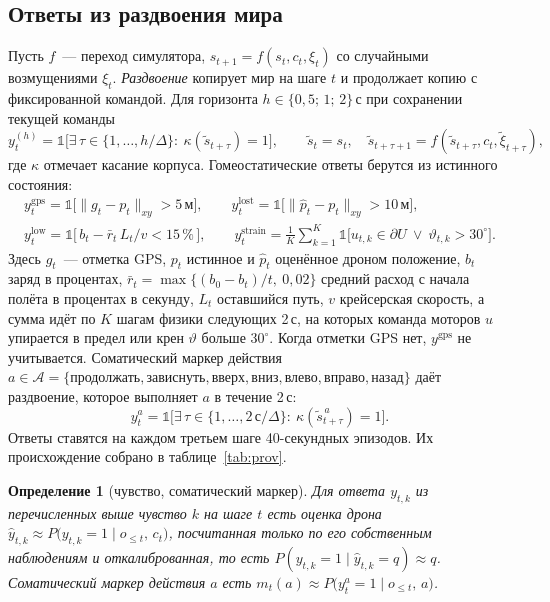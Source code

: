 \documentclass[10pt]{article}
\newtheorem{definition}{Определение}
\begin{document}
\subsection{Ответы из раздвоения мира}
Пусть $f$~--- переход симулятора, $s_{t+1}=f(s_t,c_t,\xi_t)$ со случайными возмущениями $\xi_t$. \emph{Раздвоение} копирует мир
на шаге $t$ и продолжает копию с фиксированной командой. Для горизонта $h\in\{0{,}5;\,1;\,2\}$\,с при сохранении текущей команды
\begin{equation}
y^{(h)}_t=\mathbb{1}\Big[\exists\,\tau\in\{1,\dots,h/\Delta\}:\ \kappa(\tilde s_{t+\tau})=1\Big],\qquad
\tilde s_t=s_t,\quad \tilde s_{t+\tau+1}=f(\tilde s_{t+\tau},c_t,\tilde\xi_{t+\tau}),
\end{equation}
где $\kappa$ отмечает касание корпуса. Гомеостатические ответы берутся из истинного состояния:
\begin{gather}
y^{\mathrm{gps}}_t=\mathbb{1}\big[\lVert g_t-p_t\rVert_{xy}>5\,\text{м}\big],\qquad
y^{\mathrm{lost}}_t=\mathbb{1}\big[\lVert \hat p_t-p_t\rVert_{xy}>10\,\text{м}\big],\\
y^{\mathrm{low}}_t=\mathbb{1}\big[\,b_t-\bar r_t\,L_t/v<15\,\%\,\big],\qquad
y^{\mathrm{strain}}_t=\frac{1}{K}\sum_{k=1}^{K}\mathbb{1}\big[u_{t,k}\in\partial U\ \lor\ \vartheta_{t,k}>30^\circ\big].
\end{gather}
Здесь $g_t$~--- отметка GPS, $p_t$ истинное и $\hat p_t$ оценённое дроном положение, $b_t$ заряд в процентах,
$\bar r_t=\max\{(b_0-b_t)/t,\ 0{,}02\}$ средний расход с начала полёта в процентах в секунду, $L_t$ оставшийся путь, $v$ крейсерская
скорость, а сумма идёт по $K$ шагам физики следующих 2\,с, на которых команда моторов $u$ упирается в предел или крен
$\vartheta$ больше $30^\circ$. Когда отметки GPS нет, $y^{\mathrm{gps}}$ не учитывается. Соматический маркер действия
$a\in\mathcal A=\{\text{продолжать},\text{зависнуть},\text{вверх},\text{вниз},\text{влево},\text{вправо},\text{назад}\}$ даёт
раздвоение, которое выполняет $a$ в течение 2\,с:
\begin{equation}
y^{a}_t=\mathbb{1}\Big[\exists\,\tau\in\{1,\dots,2\,\text{с}/\Delta\}:\ \kappa(\tilde s^{\,a}_{t+\tau})=1\Big].
\end{equation}
Ответы ставятся на каждом третьем шаге 40-секундных эпизодов. Их происхождение собрано в таблице~\ref{tab:prov}.

\begin{definition}[чувство, соматический маркер]\label{def:feeling}
Для ответа $y_{t,k}$ из перечисленных выше чувство $k$ на шаге $t$ есть оценка дрона
$\hat y_{t,k}\approx P\big(y_{t,k}=1\mid o_{\le t},\,c_t\big)$, посчитанная только по его собственным наблюдениям и откалиброванная,
то есть $P(y_{t,k}=1\mid\hat y_{t,k}=q)\approx q$. Соматический маркер действия $a$ есть
$m_t(a)\approx P\big(y^{a}_t=1\mid o_{\le t},\,a\big)$.
\end{definition}
\end{document}
